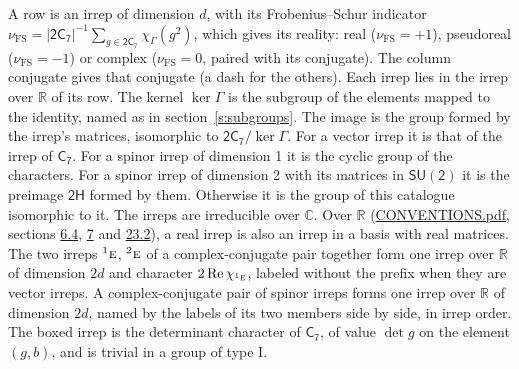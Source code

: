 \documentclass[10pt,a4paper]{article}
\numberwithin{equation}{section}
\newcommand{\grp}[1]{\mathsf{#1}}
\newcommand{\irr}[1]{\text{\normalfont\scshape #1}}
\newcommand{\conjpair}[1]{{}^{#1}}
\newcommand{\irchar}[1]{\chi_{#1}}
\newcommand{\fsind}{\nu_{\mathrm{FS}}}
\begin{document}
\leavevmode\label{n:index.frobenius}\label{n:head.irrep}\label{n:head.reality}A row is an irrep of dimension $d$, with its Frobenius--Schur indicator $\fsind = |\grp{2C_{7}}|^{-1}\allowbreak\sum_{g\in\grp{2C_{7}}}\irchar{\Gamma}(g^2)$, which gives its reality: real ($\fsind = +1$), pseudoreal ($\fsind = -1$) or complex ($\fsind = 0$, paired with its conjugate). \label{n:head.conjugate}The column conjugate gives that conjugate (a dash for the others). \label{n:head.over.real}Each irrep lies in the irrep over $\mathbb{R}$ of its row. \label{n:head.kernel}The kernel $\ker\Gamma$ is the subgroup of the elements mapped to the identity, named as in section~\ref{s:subgroups}. \label{n:head.image}The image is the group formed by the irrep's matrices, isomorphic to $\grp{2C_{7}}/\ker\Gamma$. For a vector irrep it is that of the irrep of \href{../../../rotation/data/pdf/C7.pdf}{$\grp{C_{7}}$}. For a spinor irrep of dimension 1 it is the cyclic group of the characters. For a spinor irrep of dimension 2 with its matrices in $\grp{SU(2)}$ it is the preimage $\grp{2H}$ formed by them. Otherwise it is the group of this catalogue isomorphic to it. The irreps are irreducible over $\mathbb{C}$. Over $\mathbb{R}$ (\href{../../CONVENTIONS.pdf}{CONVENTIONS.pdf}, sections \href{../../../rotation/CONVENTIONS.pdf\#conv.6.4}{6.4}, \href{../../../rotation/CONVENTIONS.pdf\#conv.7}{7} and \href{../../CONVENTIONS.pdf\#conv.23.2}{23.2}), a real irrep is also an irrep in a basis with real matrices. The two irreps $\conjpair{1}\irr{e}$, $\conjpair{2}\irr{e}$ of a complex-conjugate pair together form one irrep over $\mathbb{R}$ of dimension $2d$ and character $2\operatorname{Re}\irchar{\conjpair{1}\irr{e}}$, labeled without the prefix when they are vector irreps. A complex-conjugate pair of spinor irreps forms one irrep over $\mathbb{R}$ of dimension $2d$, named by the labels of its two members side by side, in irrep order. \label{n:mark.determinant}The boxed irrep is the determinant character of \href{../../../rotation/data/pdf/C7.pdf}{$\grp{C_{7}}$}, of value $\det g$ on the element $(g, b)$, and is trivial in a group of type I.
\setlength{\emergencystretch}{2em}\par\setlength{\emergencystretch}{0pt}
\end{document}
